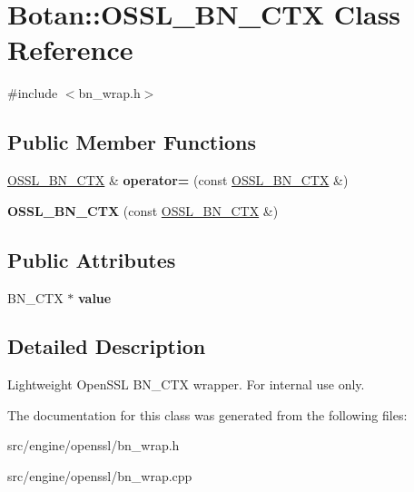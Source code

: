 \hypertarget{classBotan_1_1OSSL__BN__CTX}{\section{Botan\-:\-:O\-S\-S\-L\-\_\-\-B\-N\-\_\-\-C\-T\-X Class Reference}
\label{classBotan_1_1OSSL__BN__CTX}
}


{\ttfamily \#include $<$bn\-\_\-wrap.\-h$>$}

\subsection*{Public Member Functions}
\begin{DoxyCompactItemize}
\item 
\hypertarget{classBotan_1_1OSSL__BN__CTX_ad97daf51dcf8275fdaacb003fbf81c52}{\hyperlink{classBotan_1_1OSSL__BN__CTX}{O\-S\-S\-L\-\_\-\-B\-N\-\_\-\-C\-T\-X} \& {\bfseries operator=} (const \hyperlink{classBotan_1_1OSSL__BN__CTX}{O\-S\-S\-L\-\_\-\-B\-N\-\_\-\-C\-T\-X} \&)}\label{classBotan_1_1OSSL__BN__CTX_ad97daf51dcf8275fdaacb003fbf81c52}

\item 
\hypertarget{classBotan_1_1OSSL__BN__CTX_a5530739220a1870274ae90debc6beebe}{{\bfseries O\-S\-S\-L\-\_\-\-B\-N\-\_\-\-C\-T\-X} (const \hyperlink{classBotan_1_1OSSL__BN__CTX}{O\-S\-S\-L\-\_\-\-B\-N\-\_\-\-C\-T\-X} \&)}\label{classBotan_1_1OSSL__BN__CTX_a5530739220a1870274ae90debc6beebe}

\end{DoxyCompactItemize}
\subsection*{Public Attributes}
\begin{DoxyCompactItemize}
\item 
\hypertarget{classBotan_1_1OSSL__BN__CTX_a895e30073309acfa1a7024e85a0453dd}{B\-N\-\_\-\-C\-T\-X $\ast$ {\bfseries value}}\label{classBotan_1_1OSSL__BN__CTX_a895e30073309acfa1a7024e85a0453dd}

\end{DoxyCompactItemize}


\subsection{Detailed Description}
Lightweight Open\-S\-S\-L B\-N\-\_\-\-C\-T\-X wrapper. For internal use only. 

The documentation for this class was generated from the following files\-:\begin{DoxyCompactItemize}
\item 
src/engine/openssl/bn\-\_\-wrap.\-h\item 
src/engine/openssl/bn\-\_\-wrap.\-cpp\end{DoxyCompactItemize}
